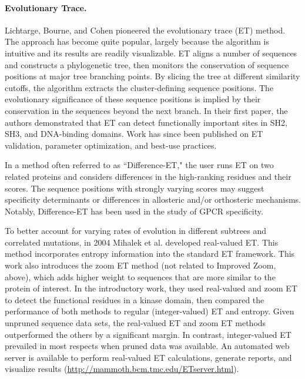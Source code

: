 \paragraph{Evolutionary Trace.} Lichtarge, Bourne, and Cohen pioneered the evolutionary trace (ET) method. The approach has become quite popular, largely because the algorithm is intuitive and its results are readily visualizable.\cite{Lichtarge1996} ET aligns a number of sequences and constructs a phylogenetic tree, then monitors the conservation of sequence positions at major tree branching points. By slicing the tree at different similarity cutoffs, the algorithm extracts the cluster-defining sequence positions. The evolutionary significance of these sequence positions is implied by their conservation in the sequences beyond the next branch. In their first paper,\cite{Lichtarge1996} the authors demonstrated that ET can detect functionally important sites in SH2, SH3, and DNA-binding domains. Work has since been published on ET validation, parameter optimization, and best-use practices.\cite{Madabushi2002a}
\par In a method often referred to as ``Difference-ET," the user runs ET on two related proteins and considers differences in the high-ranking residues and their scores. The sequence positions with strongly varying scores may suggest specificity determinants or differences in allosteric and/or orthosteric mechanisms. Notably, Difference-ET has been used in the study of GPCR specificity.\cite{Raviscioni2006a,Rodriguez2010a,Madabushi2004}
\par To better account for varying rates of evolution in different subtrees and correlated mutations, in 2004 Mihalek et al. developed real-valued ET.\cite{Mihalek2004a} This method incorporates entropy information into the standard ET framework. This work also introduces the zoom ET method (not related to Improved Zoom, above), which adds higher weight to sequences that are more similar to the protein of interest. In the introductory work, they used real-valued and zoom ET to detect the functional residues in a kinase domain, then compared the performance of both methods to regular (integer-valued) ET and entropy. Given unpruned sequence data sets, the real-valued ET and zoom ET methods outperformed the others by a significant margin. In contrast, integer-valued ET prevailed in most respects when pruned data was available. An automated web server is available to perform real-valued ET calculations, generate reports, and visualize results (\url{http://mammoth.bcm.tmc.edu/ETserver.html}).\cite{Mihalek2006a}
